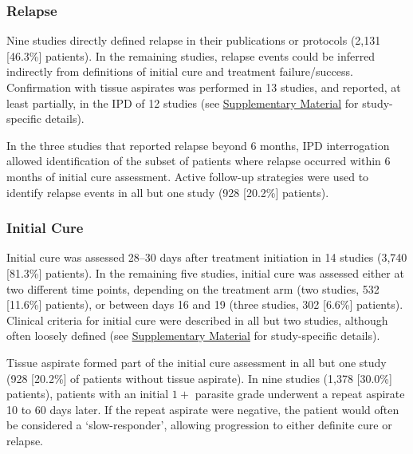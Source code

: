 \subsubsection{Relapse}

Nine studies directly defined relapse in their publications or protocols (2,131 [46.3\%] patients)\cite{sundar2019,koirala2003,sundar2007a,rijal2010a, rijal2010b,rijal2003,pandey2017,das2009,bhattacharya2007}. In the remaining studies, relapse events could be inferred indirectly from definitions of initial cure and treatment failure/success. Confirmation with tissue aspirates was performed in 13 studies, and reported, at least partially, in the IPD of 12 studies (see \href{https://github.com/jpwil/dphil}{Supplementary Material} for study-specific details).

In the three studies that reported relapse beyond 6 months\cite{sundar2019,sundar2008,rijal2010b}, IPD interrogation allowed identification of the subset of patients where relapse occurred within 6 months of initial cure assessment. Active follow-up strategies were used to identify relapse events in all but one study (928 [20.2\%] patients)\cite{sundar2019}.

\subsubsection{Initial Cure\label{sec:isc_initial_cure}}

Initial cure was assessed 28--30 days after treatment initiation in 14 studies (3,740 [81.3\%] patients)\cite{bhattacharya2007,chakraborty2008,das2009,pandey2016,pandey2017,rijal2003,rijal2010b,sundar2010,sundar2011,sundar2012,sundar2014,sundar2015,sundar2019,koirala2003}. In the remaining five studies, initial cure was assessed either at two different time points, depending on the treatment arm (two studies, 532 [11.6\%] patients)\cite{sundar2007a,sundar2009}, or between days 16 and 19 (three studies, 302 [6.6\%] patients)\cite{rijal2010a,sundar2008,sundar2008B}. Clinical criteria for initial cure were described in all but two studies\cite{bhattacharya2007,chakraborty2008}, although often loosely defined (see \href{https://github.com/jpwil/dphil}{Supplementary Material} for study-specific details).

Tissue aspirate formed part of the initial cure assessment in all but one study (928 [20.2\%] of patients without tissue aspirate)\cite{sundar2019}. In nine studies (1,378 [30.0\%] patients)\cite{bhattacharya2007,koirala2003,rijal2003,rijal2010a,sundar2007a,sundar2008B,sundar2009,sundar2014,sundar2015}, patients with an initial $1+$ parasite grade underwent a repeat aspirate 10 to 60 days later. If the repeat aspirate were negative, the patient would often be considered a `slow-responder', allowing progression to either definite cure or relapse.

